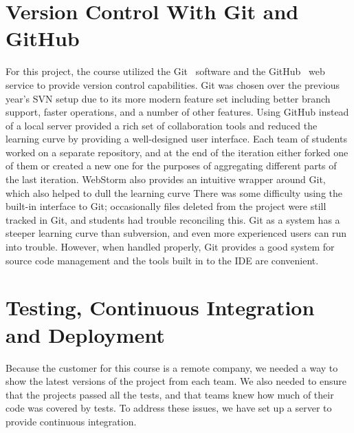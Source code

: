 \documentclass[12pt]{article}
\begin{document}
\section{Version Control With Git and GitHub}\label{sec:git}
For this project, the course utilized the Git~\cite{Git} software and the GitHub~\cite{GitHub} web service to provide version control capabilities. Git was chosen over the previous year's SVN setup due to its more modern feature set including better branch support, faster operations, and a number of other features. Using GitHub instead of a local server provided a rich set of collaboration tools and reduced the learning curve by providing a well-designed user interface. Each team of students worked on a separate repository, and at the end of the iteration either forked one of them or created a new one for the purposes of aggregating different parts of the last iteration. WebStorm also provides an intuitive wrapper around Git, which also helped to dull the learning curve There was some difficulty using the built-in interface to Git; occasionally files deleted from the project were still tracked in Git, and students had trouble reconciling this. Git as a system has a steeper learning curve than subversion, and even more experienced users can run into trouble. However, when handled properly, Git provides a good system for source code management and the tools built in to the IDE are convenient.


\section{Testing, Continuous Integration and Deployment}\label{sec:CI}
Because the customer for this course is a remote company, we needed a way to show the latest versions of the project from each team. We also needed to ensure that the projects passed all the tests, and that teams knew how much of their code was covered by tests. To address these issues, we have set up a server to provide continuous integration.
\end{document}
